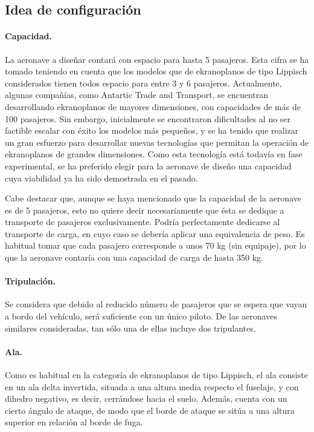 \FloatBarrier

\subsection{Idea de configuración}
\label{sec:design:config}

\paragraph{Capacidad.} La aeronave a diseñar contará con espacio para hasta 5 pasajeros. Esta cifra se ha tomado teniendo en cuenta que los modelos que de ekranoplanos de tipo Lippisch considerados tienen todos espacio para entre 3 y 6 pasajeros. Actualmente, algunas compañías, como Antartic Trade and Transport, se encuentran desarrollando ekranoplanos de mayores dimensiones, con capacidades de más de 100 pasajeros. Sin embargo, inicialmente se encontraron dificultades al no ser factible escalar con éxito los modelos más pequeños, y se ha tenido que realizar un gran esfuerzo para desarrollar nuevas tecnologías que permitan la operación de ekranoplanos de grandes dimensiones. Como esta tecnología está todavía en fase experimental, se ha preferido elegir para la aeronave de diseño una capacidad cuya viabilidad ya ha sido demostrada en el pasado.

Cabe destacar que, aunque se haya mencionado que la capacidad de la aeronave es de 5 pasajeros, esto no quiere decir necesariamente que ésta se dedique a transporte de pasajeros exclusivamente. Podría perfectamente dedicarse al transporte de carga, en cuyo caso se debería aplicar una equivalencia de peso. Es habitual tomar que cada pasajero corresponde a unos 70 kg (sin equipaje), por lo que la aeronave contaría con una capacidad de carga de hasta 350 kg.

\paragraph{Tripulación.} Se considera que debido al reducido número de pasajeros que se espera que vayan a bordo del vehículo, será suficiente con un único piloto. De las aeronaves similares consideradas, tan sólo una de ellas incluye dos tripulantes.

\paragraph{Ala.} Como es habitual en la categoría de ekranoplanos de tipo Lippisch, el ala consiste en un ala delta invertida, situada a una altura media respecto el fuselaje, y con dihedro negativo, es decir, cerrándose hacia el suelo. Además, cuenta con un cierto ángulo de ataque, de modo que el borde de ataque se sitúa a una altura superior en relación al borde de fuga.

